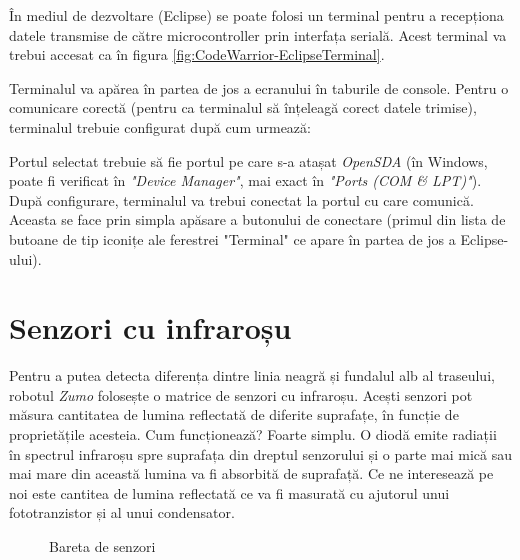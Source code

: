 În mediul de dezvoltare (Eclipse) se poate folosi un terminal pentru a recepționa datele transmise de către microcontroller prin interfața serială. Acest terminal va trebui accesat ca în figura \ref{fig:CodeWarrior-EclipseTerminal}.

Terminalul va apărea în partea de jos a ecranului în taburile de console. Pentru o comunicare corectă (pentru ca terminalul să înțeleagă corect datele trimise), terminalul trebuie configurat după cum urmează:

Portul selectat trebuie să fie portul pe care s-a atașat \textit{OpenSDA} (în Windows, poate fi verificat în \textit{"Device Manager"}, mai exact în \textit{"Ports (COM \& LPT)"}). După configurare, terminalul va trebui conectat la portul cu care comunică. Aceasta se face prin simpla apăsare a butonului de conectare (primul din lista de butoane de tip iconițe ale ferestrei "Terminal" ce apare în partea de jos a Eclipse-ului).

\section{Senzori cu infraroșu}

Pentru a putea detecta diferența dintre linia neagră și fundalul alb al traseului, robotul \textit{Zumo} folosește o matrice de senzori cu infraroșu. Acești senzori pot măsura cantitatea de lumina reflectată de diferite suprafațe, în funcție de proprietățile acesteia. Cum funcționează? Foarte simplu. O diodă emite radiații în spectrul infraroșu spre suprafața din dreptul senzorului și o parte mai mică sau mai mare din această lumina va fi absorbită de suprafață. Ce ne interesează pe noi este cantitea de lumina reflectată ce va fi masurată cu ajutorul unui fototranzistor și al unui condensator.

\begin{figure}
    \vspace{-20pt}
    \vspace{-15pt}
    \caption{\label{fig:CodeWarrior-InfraredSensors} Bareta de senzori}
    \vspace{-20pt}
\end{figure}

